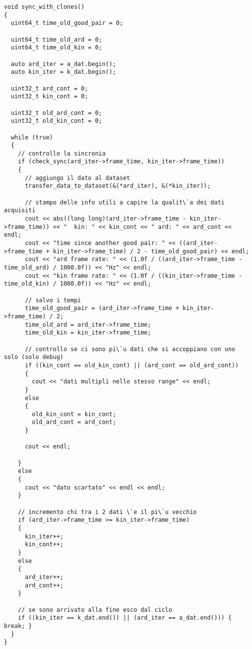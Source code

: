 \documentclass[10pt,a4paper]{article}
\begin{document}
\begin{lstlisting}[style=mycpp, caption=funzione sync\_with\_clones, captionpos=b, label={lst:syncclones}]
void sync_with_clones()
{
  uint64_t time_old_good_pair = 0;

  uint64_t time_old_ard = 0;
  uint64_t time_old_kin = 0;

  auto ard_iter = a_dat.begin();
  auto kin_iter = k_dat.begin();

  uint32_t ard_cont = 0;
  uint32_t kin_cont = 0;

  uint32_t old_ard_cont = 0;
  uint32_t old_kin_cont = 0;

  while (true)
  {
    // controllo la sincronia 
    if (check_sync(ard_iter->frame_time, kin_iter->frame_time))
    {
      // aggiungo il dato al dataset
      transfer_data_to_dataset(&(*ard_iter), &(*kin_iter));

      // stampo delle info utili a capire la qualit\`a dei dati acquisiti
      cout << abs((long long)(ard_iter->frame_time - kin_iter->frame_time)) << "  kin: " << kin_cont << " ard: " << ard_cont << endl;
      cout << "time since another good pair: " << ((ard_iter->frame_time + kin_iter->frame_time) / 2 - time_old_good_pair) << endl;
      cout << "ard frame rate: " << (1.0f / ((ard_iter->frame_time - time_old_ard) / 1000.0f)) << "Hz" << endl;
      cout << "kin frame rate: " << (1.0f / ((kin_iter->frame_time - time_old_kin) / 1000.0f)) << "Hz" << endl;

      // salvo i tempi
      time_old_good_pair = (ard_iter->frame_time + kin_iter->frame_time) / 2;
      time_old_ard = ard_iter->frame_time;
      time_old_kin = kin_iter->frame_time;

      // controllo se ci sono pi\`u dati che si accoppiano con uno solo (solo debug)
      if ((kin_cont == old_kin_cont) || (ard_cont == old_ard_cont))
      {
        cout << "dati multipli nello stesso range" << endl;
      }
      else
      {
        old_kin_cont = kin_cont;
        old_ard_cont = ard_cont;
      }

      cout << endl;

    }
    else
    {
      cout << "dato scartato" << endl << endl;
    }

    // incremento chi tra i 2 dati \`e il pi\`u vecchio
    if (ard_iter->frame_time >= kin_iter->frame_time)
    {
      kin_iter++;
      kin_cont++;
    }
    else
    {
      ard_iter++;
      ard_cont++;
    }

    // se sono arrivato alla fine esco dal ciclo
    if ((kin_iter == k_dat.end()) || (ard_iter == a_dat.end())) { break; }
  }
}
\end{lstlisting}
\end{document}

